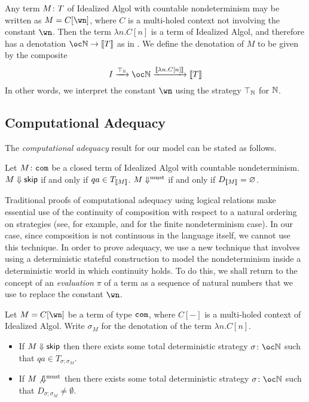 \documentclass[sigplan,9pt,review]{acmart}\settopmatter{printfolios=true,printccs=false,printacmref=false}
\begin{document}
Any term $M\colon T$ of Idealized Algol with countable nondeterminism may be written as $M = C[\wn]$, where $C$ is a multi-holed context not involving the constant $\wn$.  
Then the term $\lambda n.C[n]$ is a term of Idealized Algol, and therefore has a denotation $\oc\bN \to \deno{T}$ as in \cite{SamsonGuyIAPassive}.
We define the denotation of $M$ to be given by the composite
\[
  I \xrightarrow{\top_{\bN}}
  \oc \bN \xrightarrow{\deno{\lambda n.C[n]}}
  \deno{T}
  \]
In other words, we interpret the constant $\wn$ using the strategy $\top_{\mathbb{N}}$ for $\mathbb{N}$.

\subsection{Computational Adequacy}

The \emph{computational adequacy} result for our model can be stated as follows.

\begin{proposition}
  Let $M\colon{\mathtt{com}}$ be a closed term of Idealized Algol with countable nondeterminism.
  $M\Downarrow{\mathsf{skip}}$ if and only if $qa\in T_{\left\llbracket M\right\rrbracket}$.  
  $M\Downarrow^{\text{must}}$ if and only if $D_{\left\llbracket M\right\rrbracket}=\varnothing$.
  \label{prop:adequacy}
\end{proposition}

Traditional proofs of computational adequacy using logical relations make essential use of the continuity of composition with respect to a natural ordering on strategies (see, for example, \cite{mcCHFiniteND} and \cite{RusssThesis} for the finite nondeterminism case).  
In our case, since composition is not continuous in the language itself, we cannot use this technique.
In order to prove adequacy, we use a new technique that involves using a deterministic stateful construction to model the nondeterminism inside a deterministic world in which continuity holds.  
To do this, we shall return to the concept of an \emph{evaluation} $\pi$ of a term as a sequence of natural numbers that we use to replace the constant $\wn$.  

\begin{lemma}
  Let $M=C[\wn]$ be a term of type ${\mathtt{com}}$, where $C[-]$ is a multi-holed context of Idealized Algol.
  Write $\sigma_M$ for the denotation of the term $\lambda n.C[n]$.  
  \begin{itemize}
    \item If $M\Downarrow{\mathsf{skip}}$ then there exists some total deterministic strategy $\sigma\from\oc\bN$ such that $qa\in T_{\sigma;\sigma_M}$.
    \item If $M\not{\Downarrow^{\text{must}}}$ then there exists some total deterministic strategy $\sigma\from\oc\bN$ such that $D_{\sigma;\sigma_M}\ne\emptyset$.
  \end{itemize}
  \label{lem:soundness-lemma}
\end{lemma}
\end{document}
